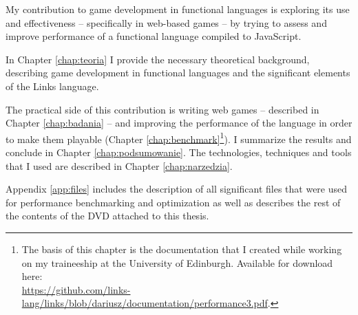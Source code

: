 My contribution to game development in functional languages is exploring its use and effectiveness -- specifically in web-based games -- by trying to assess and improve performance of a functional language compiled to JavaScript. 

In Chapter \ref{chap:teoria} I provide the necessary theoretical background, describing game development in functional languages and the significant elements of the Links language.

The practical side of this contribution is writing web games -- described in Chapter \ref{chap:badania} -- and improving the performance of the language in order to make them playable (Chapter \ref{chap:benchmark}\footnote{The basis of this chapter is the documentation that I created while working on my traineeship at the University of Edinburgh. Available for download here:\\ 
\url{https://github.com/links-lang/links/blob/dariusz/documentation/performance3.pdf}.}). 
I summarize the results and conclude in Chapter \ref{chap:podsumowanie}.
The technologies, techniques and tools that I used are described in Chapter \ref{chap:narzedzia}.

Appendix \ref{app:files} includes the description of all significant files that were used for performance benchmarking and optimization as well as describes the rest of the contents of the DVD attached to this thesis.






